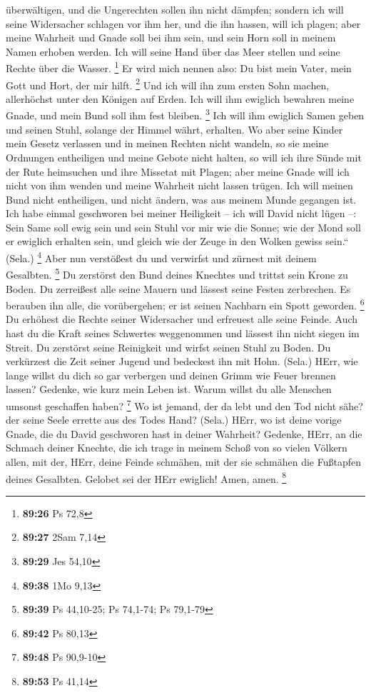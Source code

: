 überwältigen, und die Ungerechten sollen ihn nicht dämpfen;
 sondern ich will seine Widersacher schlagen vor ihm her,
und die ihn hassen, will ich plagen;  aber meine Wahrheit
und Gnade soll bei ihm sein, und sein Horn soll in meinem Namen erhoben
werden.  Ich will seine Hand über das Meer stellen und
seine Rechte über die Wasser. \footnote{\textbf{89:26} Ps 72,8}
 Er wird mich nennen also: Du bist mein Vater, mein Gott
und Hort, der mir hilft. \footnote{\textbf{89:27} 2Sam 7,14}
 Und ich will ihn zum ersten Sohn machen, allerhöchst
unter den Königen auf Erden.  Ich will ihm ewiglich
bewahren meine Gnade, und mein Bund soll ihm fest bleiben. \footnote{\textbf{89:29}
  Jes 54,10}  Ich will ihm ewiglich Samen geben und
seinen Stuhl, solange der Himmel währt, erhalten.  Wo
aber seine Kinder mein Gesetz verlassen und in meinen Rechten nicht
wandeln,  so sie meine Ordnungen entheiligen und meine
Gebote nicht halten,  so will ich ihre Sünde mit der Rute
heimsuchen und ihre Missetat mit Plagen;  aber meine
Gnade will ich nicht von ihm wenden und meine Wahrheit nicht lassen
trügen.  Ich will meinen Bund nicht entheiligen, und
nicht ändern, was aus meinem Munde gegangen ist.  Ich
habe einmal geschworen bei meiner Heiligkeit -- ich will David nicht
lügen --:  Sein Same soll ewig sein und sein Stuhl vor
mir wie die Sonne;  wie der Mond soll er ewiglich
erhalten sein, und gleich wie der Zeuge in den Wolken gewiss sein.``
(Sela.) \footnote{\textbf{89:38} 1Mo 9,13}  Aber nun
verstößest du und verwirfst und zürnest mit deinem Gesalbten.
\footnote{\textbf{89:39} Ps 44,10-25; Ps 74,1-74; Ps 79,1-79}
 Du zerstörst den Bund deines Knechtes und trittst sein
Krone zu Boden.  Du zerreißest alle seine Mauern und
lässest seine Festen zerbrechen.  Es berauben ihn alle,
die vorübergehen; er ist seinen Nachbarn ein Spott geworden. \footnote{\textbf{89:42}
  Ps 80,13}  Du erhöhest die Rechte seiner Widersacher
und erfreuest alle seine Feinde.  Auch hast du die Kraft
seines Schwertes weggenommen und lässest ihn nicht siegen im Streit.
 Du zerstörst seine Reinigkeit und wirfst seinen Stuhl zu
Boden.  Du verkürzest die Zeit seiner Jugend und
bedeckest ihn mit Hohn. (Sela.)  HErr, wie lange willst
du dich so gar verbergen und deinen Grimm wie Feuer brennen lassen?
 Gedenke, wie kurz mein Leben ist. Warum willst du alle
Menschen umsonst geschaffen haben? \footnote{\textbf{89:48} Ps 90,9-10}
 Wo ist jemand, der da lebt und den Tod nicht sähe? der
seine Seele errette aus des Todes Hand? (Sela.)  HErr, wo
ist deine vorige Gnade, die du David geschworen hast in deiner Wahrheit?
 Gedenke, HErr, an die Schmach deiner Knechte, die ich
trage in meinem Schoß von so vielen Völkern allen,  mit
der, HErr, deine Feinde schmähen, mit der sie schmähen die Fußtapfen
deines Gesalbten.  Gelobet sei der HErr ewiglich! Amen,
amen. \footnote{\textbf{89:53} Ps 41,14}

